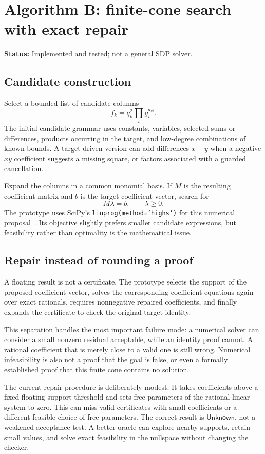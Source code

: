 \documentclass[11pt,a4paper]{article}
\theoremstyle{definition}
\newcommand{\unknown}{\ensuremath{\mathsf{Unknown}}}
\newcommand{\status}[1]{\textbf{Status:} #1.}
\newcommand{\code}[1]{\texttt{#1}}
\begin{document}
\section{Algorithm B: finite-cone search with exact repair}
\status{Implemented and tested; not a general SDP solver}

\subsection{Candidate construction}

Select a bounded list of candidate columns
\[
 f_k=q_k^2\prod_i g_i^{a_{ki}}.
\]
The initial candidate grammar uses constants, variables, selected sums or differences, products occurring in the target, and low-degree combinations of known bounds. A target-driven version can add differences $x-y$ when a negative $xy$ coefficient suggests a missing square, or factors associated with a guarded cancellation.

Expand the columns in a common monomial basis. If $M$ is the resulting coefficient matrix and $b$ is the target coefficient vector, search for
\[
 M\lambda=b,\qquad \lambda\ge0.
\]
The prototype uses SciPy's \code{linprog(method='highs')} for this numerical proposal~\cite{scipy}. Its objective slightly prefers smaller candidate expressions, but feasibility rather than optimality is the mathematical issue.

\subsection{Repair instead of rounding a proof}

A floating result is not a certificate. The prototype selects the support of the proposed coefficient vector, solves the corresponding coefficient equations again over exact rationals, requires nonnegative repaired coefficients, and finally expands the certificate to check the original target identity.

This separation handles the most important failure mode: a numerical solver can consider a small nonzero residual acceptable, while an identity proof cannot. A rational coefficient that is merely close to a valid one is still wrong. Numerical infeasibility is also not a proof that the goal is false, or even a formally established proof that this finite cone contains no solution.

The current repair procedure is deliberately modest. It takes coefficients above a fixed floating support threshold and sets free parameters of the rational linear system to zero. This can miss valid certificates with small coefficients or a different feasible choice of free parameters. The correct result is \unknown{}, not a weakened acceptance test. A better oracle can explore nearby supports, retain small values, and solve exact feasibility in the nullspace without changing the checker.
\end{document}
